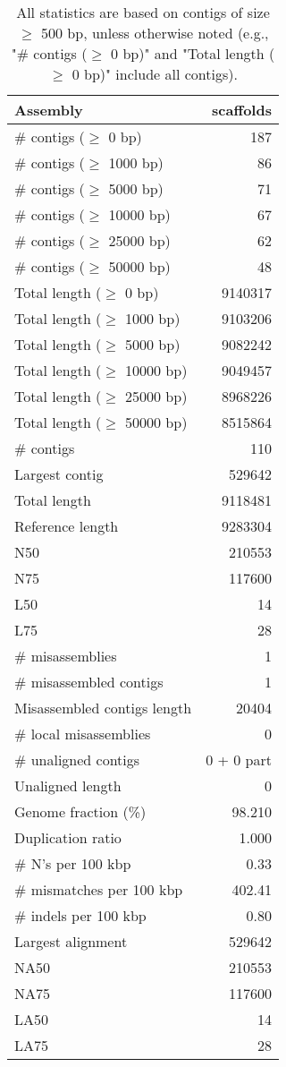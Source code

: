 \documentclass[12pt,a4paper]{article}
\begin{document}
\begin{table}[ht]
\begin{center}
\caption{All statistics are based on contigs of size $\geq$ 500 bp, unless otherwise noted (e.g., "\# contigs ($\geq$ 0 bp)" and "Total length ($\geq$ 0 bp)" include all contigs).}
\begin{tabular}{|l*{1}{|r}|}
\hline
Assembly & scaffolds \\ \hline
\# contigs ($\geq$ 0 bp) & 187 \\ \hline
\# contigs ($\geq$ 1000 bp) & 86 \\ \hline
\# contigs ($\geq$ 5000 bp) & 71 \\ \hline
\# contigs ($\geq$ 10000 bp) & 67 \\ \hline
\# contigs ($\geq$ 25000 bp) & 62 \\ \hline
\# contigs ($\geq$ 50000 bp) & 48 \\ \hline
Total length ($\geq$ 0 bp) & 9140317 \\ \hline
Total length ($\geq$ 1000 bp) & 9103206 \\ \hline
Total length ($\geq$ 5000 bp) & 9082242 \\ \hline
Total length ($\geq$ 10000 bp) & 9049457 \\ \hline
Total length ($\geq$ 25000 bp) & 8968226 \\ \hline
Total length ($\geq$ 50000 bp) & 8515864 \\ \hline
\# contigs & 110 \\ \hline
Largest contig & 529642 \\ \hline
Total length & 9118481 \\ \hline
Reference length & 9283304 \\ \hline
N50 & 210553 \\ \hline
N75 & 117600 \\ \hline
L50 & 14 \\ \hline
L75 & 28 \\ \hline
\# misassemblies & 1 \\ \hline
\# misassembled contigs & 1 \\ \hline
Misassembled contigs length & 20404 \\ \hline
\# local misassemblies & 0 \\ \hline
\# unaligned contigs & 0 + 0 part \\ \hline
Unaligned length & 0 \\ \hline
Genome fraction (\%) & 98.210 \\ \hline
Duplication ratio & 1.000 \\ \hline
\# N's per 100 kbp & 0.33 \\ \hline
\# mismatches per 100 kbp & 402.41 \\ \hline
\# indels per 100 kbp & 0.80 \\ \hline
Largest alignment & 529642 \\ \hline
NA50 & 210553 \\ \hline
NA75 & 117600 \\ \hline
LA50 & 14 \\ \hline
LA75 & 28 \\ \hline
\end{tabular}
\end{center}
\end{table}
\end{document}

